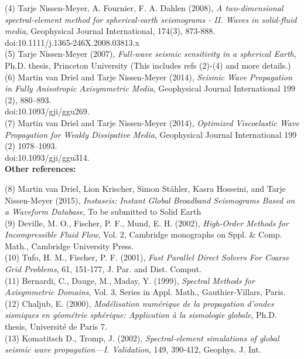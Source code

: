 \documentclass{article}
\begin{document}
(4) Tarje Nissen-Meyer, A. Fournier, F. A. Dahlen (2008),  
\textit{A two-dimensional spectral-element method for   
spherical-earth seismograms - II. Waves in solid-fluid media},
Geophysical Journal International, 174(3), 873-888.\\
doi:10.1111/j.1365-246X.2008.03813.x\\

(5) Tarje Nissen-Meyer (2007),
\textit{Full-wave seismic sensitivity in a spherical Earth},
Ph.D. thesis, Princeton University
(This includes refs (2)-(4) and more details.)\\

(6) Martin van Driel and Tarje Nissen-Meyer (2014),
\textit{Seismic Wave Propagation in Fully Anisotropic Axisymmetric Media},
Geophysical Journal International 199 (2), 880–893.\\
doi:10.1093/gji/ggu269.\\

(7) Martin van Driel and Tarje Nissen-Meyer (2014),
\textit{Optimized Viscoelastic Wave Propagation for Weakly Dissipative Media},
Geophysical Journal International 199 (2) 1078–1093.\\
doi:10.1093/gji/ggu314.\\


\noindent \textbf{Other references:}\vspace*{0.2cm}

(8) Martin van Driel, Lion Krischer, Simon St\"{a}hler, Kasra Hosseini, and Tarje Nissen-Meyer (2015),
\textit{Instaseis: Instant Global Broadband Seismograms Based on a Waveform Database},
To be submitted to Solid Earth\\

(9) Deville, M. O., Fischer, P. F., Mund, E. H. (2002), 
\textit{High-Order Methods for Incompressible Fluid Flow}, 
Vol. 2, Cambridge monographs on Sppl. \& Comp. Math., Cambridge University Press.\\

(10) Tufo, H. M., Fischer, P. F. (2001), \textit{Fast Parallel Direct Solvers For Coarse
Grid Problems}, 61, 151-177, J. Par. and Dist. Comput.\\

(11) Bernardi, C., Dauge, M., Maday, Y. (1999), \textit{Spectral Methods for Axisymmetric
Domains}, Vol. 3, Series in Appl. Math., Gauthier-Villars, Paris.\\

(12) Chaljub, E. (2000), \textit{Mod{\'{e}}lisation num{\'{e}}rique de la 
propagation d'ondes sismiques en g{\'{e}}om{\'{e}}trie sph{\'{e}}rique:
Application {\`{a}} la sismologie globale}, 
Ph.D. thesis, Universit{\'{e}} de Paris 7.\\

(13) Komatitsch D., Tromp, J. (2002), \textit{Spectral-element simulations of
global seismic wave propagation---I. Validation},
149, 390-412, Geophys. J. Int.
\end{document}
